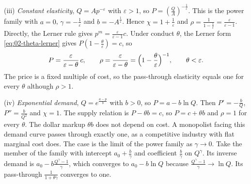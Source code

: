 \begin{example}
(iii) \emph{Constant elasticity}, $Q = Ap^{-\varepsilon}$ with $\varepsilon > 1$, so $P = (\frac{Q}{A})^{-\frac{1}{\varepsilon}}$.
This is the power family with $a = 0$, $\gamma = -\frac{1}{\varepsilon}$ and $b = -A^{\frac{1}{\varepsilon}}$.
Hence $\chi = 1 + \frac{1}{\varepsilon}$ and $\rho = \frac{1}{1 - \frac{1}{\varepsilon}} = \frac{\varepsilon}{\varepsilon - 1}$.
Directly, the Lerner rule gives $p^m = \frac{\varepsilon}{\varepsilon - 1}c$. Under conduct $\theta$, the Lerner
form \eqref{eq:02-theta-lerner} gives $P(1 - \frac{\theta}{\varepsilon}) = c$, so
\begin{equation*}
P = \frac{\varepsilon}{\varepsilon - \theta}\,c, \qquad \rho = \frac{\varepsilon}{\varepsilon - \theta}
= \Bigl(1 - \frac{\theta}{\varepsilon}\Bigr)^{-1}, \qquad \theta < \varepsilon .
\end{equation*}
The price is a fixed multiple of cost, so the pass-through elasticity equals one for every $\theta$ although
$\rho > 1$.

(iv) \emph{Exponential demand}, $Q = e^{\frac{a - p}{b}}$ with $b > 0$, so $P = a - b\ln Q$. Then
$P' = -\frac{b}{Q}$, $P'' = \frac{b}{Q^2}$ and $\chi = 1$. The supply relation is $P - \theta b = c$, so
$P = c + \theta b$ and $\rho = 1$ for every $\theta$. The dollar markup $\theta b$ does not depend on cost. A
monopolist facing this demand curve passes through exactly one, as a competitive industry with flat marginal cost
does. The case is the limit of the power family as $\gamma \to 0$. Take the member of the family with
intercept $a_0 + \frac{b}{\gamma}$ and coefficient $\frac{b}{\gamma}$ on $Q^{\gamma}$. Its inverse demand is
$a_0 - b\frac{Q^{\gamma} - 1}{\gamma}$, which converges to $a_0 - b\ln Q$ because
$\frac{Q^{\gamma} - 1}{\gamma} \to \ln Q$. Its pass-through $\frac{1}{1 + \theta\gamma}$ converges to one.


\end{example}
